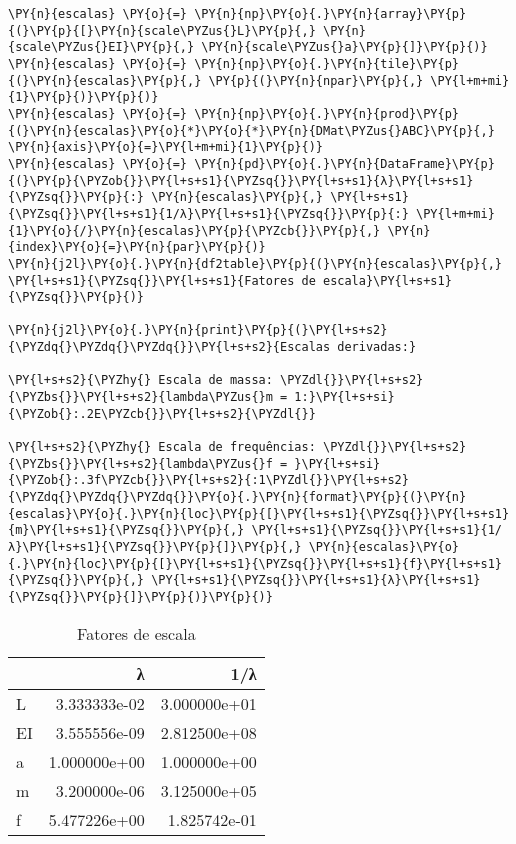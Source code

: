     \begin{tcolorbox}[breakable, size=fbox, boxrule=1pt, pad at break*=1mm,colback=cellbackground, colframe=cellborder]
\begin{Verbatim}[commandchars=\\\{\}]
\PY{n}{escalas} \PY{o}{=} \PY{n}{np}\PY{o}{.}\PY{n}{array}\PY{p}{(}\PY{p}{[}\PY{n}{scale\PYZus{}L}\PY{p}{,} \PY{n}{scale\PYZus{}EI}\PY{p}{,} \PY{n}{scale\PYZus{}a}\PY{p}{]}\PY{p}{)}
\PY{n}{escalas} \PY{o}{=} \PY{n}{np}\PY{o}{.}\PY{n}{tile}\PY{p}{(}\PY{n}{escalas}\PY{p}{,} \PY{p}{(}\PY{n}{npar}\PY{p}{,} \PY{l+m+mi}{1}\PY{p}{)}\PY{p}{)}
\PY{n}{escalas} \PY{o}{=} \PY{n}{np}\PY{o}{.}\PY{n}{prod}\PY{p}{(}\PY{n}{escalas}\PY{o}{*}\PY{o}{*}\PY{n}{DMat\PYZus{}ABC}\PY{p}{,} \PY{n}{axis}\PY{o}{=}\PY{l+m+mi}{1}\PY{p}{)}
\PY{n}{escalas} \PY{o}{=} \PY{n}{pd}\PY{o}{.}\PY{n}{DataFrame}\PY{p}{(}\PY{p}{\PYZob{}}\PY{l+s+s1}{\PYZsq{}}\PY{l+s+s1}{λ}\PY{l+s+s1}{\PYZsq{}}\PY{p}{:} \PY{n}{escalas}\PY{p}{,} \PY{l+s+s1}{\PYZsq{}}\PY{l+s+s1}{1/λ}\PY{l+s+s1}{\PYZsq{}}\PY{p}{:} \PY{l+m+mi}{1}\PY{o}{/}\PY{n}{escalas}\PY{p}{\PYZcb{}}\PY{p}{,} \PY{n}{index}\PY{o}{=}\PY{n}{par}\PY{p}{)}
\PY{n}{j2l}\PY{o}{.}\PY{n}{df2table}\PY{p}{(}\PY{n}{escalas}\PY{p}{,} \PY{l+s+s1}{\PYZsq{}}\PY{l+s+s1}{Fatores de escala}\PY{l+s+s1}{\PYZsq{}}\PY{p}{)}

\PY{n}{j2l}\PY{o}{.}\PY{n}{print}\PY{p}{(}\PY{l+s+s2}{\PYZdq{}\PYZdq{}\PYZdq{}}\PY{l+s+s2}{Escalas derivadas:}

\PY{l+s+s2}{\PYZhy{} Escala de massa: \PYZdl{}}\PY{l+s+s2}{\PYZbs{}}\PY{l+s+s2}{lambda\PYZus{}m = 1:}\PY{l+s+si}{\PYZob{}:.2E\PYZcb{}}\PY{l+s+s2}{\PYZdl{}}

\PY{l+s+s2}{\PYZhy{} Escala de frequências: \PYZdl{}}\PY{l+s+s2}{\PYZbs{}}\PY{l+s+s2}{lambda\PYZus{}f = }\PY{l+s+si}{\PYZob{}:.3f\PYZcb{}}\PY{l+s+s2}{:1\PYZdl{}}\PY{l+s+s2}{\PYZdq{}\PYZdq{}\PYZdq{}}\PY{o}{.}\PY{n}{format}\PY{p}{(}\PY{n}{escalas}\PY{o}{.}\PY{n}{loc}\PY{p}{[}\PY{l+s+s1}{\PYZsq{}}\PY{l+s+s1}{m}\PY{l+s+s1}{\PYZsq{}}\PY{p}{,} \PY{l+s+s1}{\PYZsq{}}\PY{l+s+s1}{1/λ}\PY{l+s+s1}{\PYZsq{}}\PY{p}{]}\PY{p}{,} \PY{n}{escalas}\PY{o}{.}\PY{n}{loc}\PY{p}{[}\PY{l+s+s1}{\PYZsq{}}\PY{l+s+s1}{f}\PY{l+s+s1}{\PYZsq{}}\PY{p}{,} \PY{l+s+s1}{\PYZsq{}}\PY{l+s+s1}{λ}\PY{l+s+s1}{\PYZsq{}}\PY{p}{]}\PY{p}{)}\PY{p}{)}
\end{Verbatim}
\end{tcolorbox}

    
    \begin{table}[H]
    \centering
    \caption{Fatores de escala}
    {\begin{tabular}{lrr}
\toprule
{} &             λ &           1/λ \\
\midrule
L  &  3.333333e-02 &  3.000000e+01 \\
EI &  3.555556e-09 &  2.812500e+08 \\
a  &  1.000000e+00 &  1.000000e+00 \\
m  &  3.200000e-06 &  3.125000e+05 \\
f  &  5.477226e+00 &  1.825742e-01 \\
\bottomrule
\end{tabular}
}
    \label{}
    \end{table}
    

